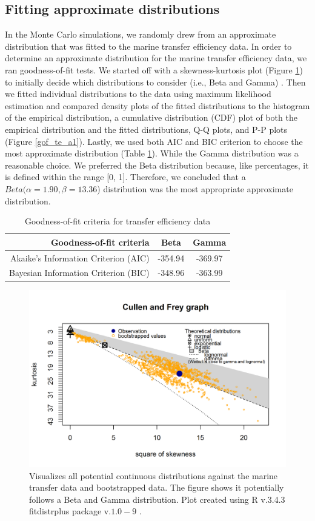 \documentclass[oneside,12pt,final]{sty/ucthesis-CA2012}
\let\cite\citep                             %
\begin{document}
\begin{mainmatter}
\section{Fitting approximate distributions}
In the Monte Carlo simulations, we randomly drew from an approximate distribution that was fitted to the marine transfer efficiency data. In order to determine an approximate distribution for the marine transfer efficiency data, we ran goodness-of-fit tests. We started off with a skewness-kurtosis plot (Figure \ref{cf_te_a1}) to initially decide which distributions to consider (i.e., Beta and Gamma) \cite{fitdistrplus}. Then we fitted individual distributions to the data using maximum likelihood estimation and compared density plots of the fitted distributions to the histogram of the empirical distribution, a cumulative distribution (CDF) plot of both the empirical distribution and the fitted distributions, Q-Q plots, and P-P plots (Figure \ref{gof_te_a1}). Lastly, we used both AIC and BIC criterion to choose the most approximate distribution (Table \ref{te_aic_a1}). While the Gamma distribution was a reasonable choice. We preferred the Beta distribution because, like percentages, it is defined within the range [0, 1]. Therefore, we concluded that a $Beta(\alpha = 1.90, \beta = 13.36$) distribution was the most appropriate approximate distribution. 

\begin{table}[H]
\centering
\caption{Goodness-of-fit criteria for transfer efficiency data}
\begin{tabular}{r|c|c}
  \hline \small
 Goodness-of-fit criteria & Beta  & Gamma \\ 
   \hline
   Akaike's Information Criterion (AIC) & -354.94 & -369.97 \\   
   Bayesian Information Criterion (BIC) & -348.96 &  -363.99  \\
   \hline
\end{tabular} 
\label{te_aic_a1}
\end{table}

\begin{figure}[H]
     \centering
       \includegraphics[width=.8\textwidth]{fig/cullen_frey_te}
    \caption{Visualizes all potential continuous distributions against the marine transfer data and bootstrapped data. The figure shows it potentially follows a Beta and Gamma distribution. Plot created using R v.3.4.3 \cite{Rcite} fitdistrplus package v.$1.0-9$ \cite{fitdistrplus}. }
    \label{cf_te_a1}
\end{figure}


\end{mainmatter}
\end{document}
